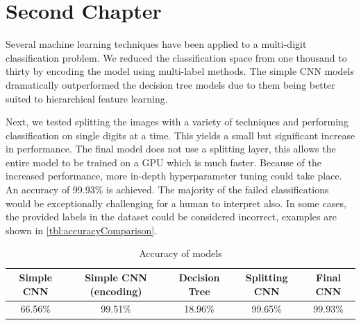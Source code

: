 \chapter{Second Chapter}

Several machine learning techniques have been applied to a multi-digit classification problem. We reduced the classification space from one thousand to thirty by encoding the model using multi-label methods. The simple CNN models dramatically outperformed the decision tree models due to them being better suited to hierarchical feature learning. 

Next, we tested splitting the images with a variety of techniques and performing classification on single digits at a time. This yields a small but significant increase in performance. The final model does not use a splitting layer, this allows the entire model to be trained on a GPU which is much faster. Because of the increased performance, more in-depth hyperparameter tuning could take place. An accuracy of 99.93\% is achieved. The majority of the failed classifications would be exceptionally challenging for a human to interpret also. In some cases, the provided labels in the dataset could be considered incorrect, examples are shown in \autoref{tbl:accuracyComparison}.

\vspace{10pt}
\bgroup
    \begin{table}[!htbp]
        \centering
        \begin{tabular}{ccccc}
            \hline
            Simple CNN & Simple CNN (encoding) & Decision Tree & Splitting CNN & Final CNN \\ \hline
            66.56\% & 99.51\% & 18.96\% & 99.65\% & 99.93\% \\
        \end{tabular}
        \caption{Accuracy of models}
        \label{tbl:accuracyComparison}
    \end{table}
\egroup
